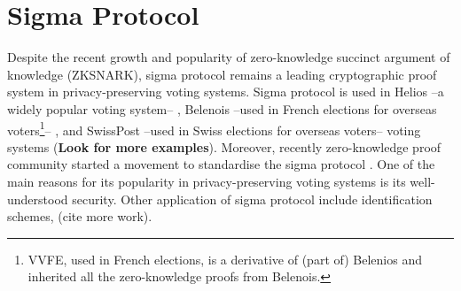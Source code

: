 \documentclass[conference,compsoc]{IEEEtran}
\begin{document}
\section{Sigma Protocol}\label{sigma_protocol}
Despite the recent growth and popularity of zero-knowledge succinct 
argument of knowledge (ZKSNARK), sigma protocol remains a
leading cryptographic proof system in privacy-preserving voting systems. 
Sigma protocol is used in Helios --a widely popular voting system-- \cite{adida2008helios}, 
Belenois --used in French elections for overseas 
voters\footnote{VVFE, used in French elections, is a derivative of (part of) Belenios and 
inherited all the zero-knowledge proofs from Belenois.}-- \cite{cortier2023french}, and 
SwissPost --used in Swiss elections for overseas voters-- voting 
systems \cite{10.1007/978-3-031-15911-4_4} (\textbf{Look for more examples}). 
Moreover, recently zero-knowledge proof community started a movement to standardise
the sigma protocol \cite{ZKProof}.
One of the main reasons for its popularity in privacy-preserving voting systems is its
well-understood security.  Other application of sigma protocol 
include identification schemes, (cite more work). 
\end{document}
